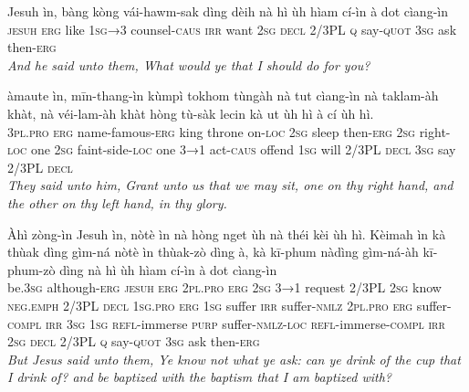 \documentclass[11pt,a4paper]{article}
\begin{document}
\begin{exe}
\gll Jesuh ìn, bàng kòng vái-hawm-sak dìng dèih nà hì ùh hìam cí-ìn à dot cìang-ìn \\
     \textsc{jesuh} \textsc{erg} like \textsc{1sg→3} counsel-\textsc{caus} \textsc{irr} want \textsc{2sg} \textsc{decl} 2/3PL \textsc{q} say-\textsc{quot} \textsc{3sg} ask then-\textsc{erg} \\
\glt \textcolor{kjvcolor}{\textit{And he said unto them, What would ye that I should do for you?}}

\gll àmaute ìn, mīn-thang-ìn kùmpì tokhom tùngàh nà tut cìang-ìn nà taklam-àh khàt, nà véi-lam-àh khàt hòng tù-sàk lecin kà ut ùh hì à cí ùh hì. \\
     \textsc{3pl}.\textsc{pro} \textsc{erg} name-famous-\textsc{erg} king throne on-\textsc{loc} \textsc{2sg} sleep then-\textsc{erg} \textsc{2sg} right-\textsc{loc} one \textsc{2sg} faint-side-\textsc{loc} one \textsc{3→1} act-\textsc{caus} offend \textsc{1sg} will 2/3PL \textsc{decl} \textsc{3sg} say 2/3PL \textsc{decl} \\
\glt \textcolor{kjvcolor}{\textit{They said unto him, Grant unto us that we may sit, one on thy right hand, and the other on thy left hand, in thy glory.}}

\gll Àhì zòng-ìn Jesuh ìn, nòtè ìn nà hòng nget ùh nà théi kèi ùh hì. Kèimah ìn kà thùak dìng gìm-ná nòtè ìn thùak-zò dìng à, kà kī-phum nàdìng gìm-ná-àh kī-phum-zò dìng nà hì ùh hìam cí-ìn à dot cìang-ìn \\
     be.\textsc{3sg} although-\textsc{erg} \textsc{jesuh} \textsc{erg} \textsc{2pl}.\textsc{pro} \textsc{erg} \textsc{2sg} \textsc{3→1} request 2/3PL \textsc{2sg} know \textsc{neg}.\textsc{emph} 2/3PL \textsc{decl} \textsc{1sg}.\textsc{pro} \textsc{erg} \textsc{1sg} suffer \textsc{irr} suffer-\textsc{nmlz} \textsc{2pl}.\textsc{pro} \textsc{erg} suffer-\textsc{compl} \textsc{irr} \textsc{3sg} \textsc{1sg} \textsc{refl}-immerse \textsc{purp} suffer-\textsc{nmlz}-\textsc{loc} \textsc{refl}-immerse-\textsc{compl} \textsc{irr} \textsc{2sg} \textsc{decl} 2/3PL \textsc{q} say-\textsc{quot} \textsc{3sg} ask then-\textsc{erg} \\
\glt \textcolor{kjvcolor}{\textit{But Jesus said unto them, Ye know not what ye ask: can ye drink of the cup that I drink of? and be baptized with the baptism that I am baptized with?}}


\end{exe}
\end{document}
